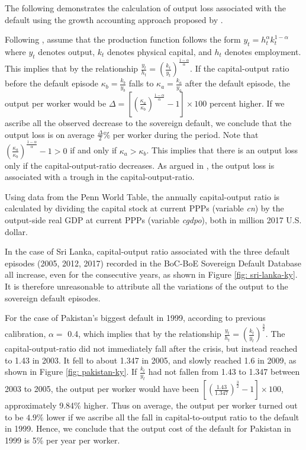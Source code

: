 The following demonstrates the calculation of output loss associated with the default using the growth accounting approach proposed by \citet{zarazaga-12}.

Following \citet{zarazaga-12}, assume that the production function follows the form $y_t = h^\alpha_t k^{1-\alpha}_t$ where $y_t$ denotes output, $k_t$ denotes physical capital, and $h_t$ denotes employment.
This implies that by the relationship $\frac{y_t}{h_t} = \left( \frac{k_t}{y_t} \right)^{\frac{1-\alpha}{\alpha}}$. If the capital-output ratio before the default episode $\kappa_b =\frac{k_b}{y_b}$ falls to $\kappa_a = \frac{k_{a}}{y_a}$ after the default episode, the output per worker would be
$\Delta = \left[\left(\frac{\kappa_a}{\kappa_b} \right)^{\frac{1-\alpha}{\alpha}} -1\right]\times 100$ percent higher.
If we ascribe all the observed decrease to the sovereign default, we conclude that the output loss is on average $\frac{\Delta}{2} \%$ per worker during the period.
Note that $\left(\frac{\kappa_a}{\kappa_b} \right)^{\frac{1-\alpha}{\alpha}} -1 > 0$ if and only if $\kappa_a > \kappa_b$. This implies that there is an output loss only if the capital-output-ratio decreases. As argued in \citet{zarazaga-12}, the output loss is associated with a trough in the capital-output-ratio.

Using data from the Penn World Table, the annually capital-output ratio is calculated by dividing the capital stock at current PPPs (variable \emph{cn}) by the output-side real GDP at current PPPs (variable \emph{cgdpo}), both in million 2017 U.S. dollar.

In the case of Sri Lanka, capital-output ratio associated with the three default episodes (2005, 2012, 2017) recorded in the BoC-BoE Sovereign Default Database all increase, even for the consecutive years, as shown in Figure \ref{fig: sri-lanka-ky}. It is therefore unreasonable to attribute all the variations of the output to the sovereign default episodes.

For the case of Pakistan's biggest default in 1999, according to previous calibration, $\alpha=$ 0.4, which implies that by the relationship $\frac{y_t}{h_t} = \left( \frac{k_t}{y_t} \right)^{\frac{3}{2}}$.
The capital-output-ratio did not immediately fall after the crisis, but instead reached to 1.43 in 2003. It fell to about 1.347 in 2005, and slowly reached 1.6 in 2009, as shown in Figure \ref{fig: pakistan-ky}.
If $\frac{k_t}{y_t}$ had not fallen from 1.43 to 1.347 between 2003 to 2005, the output per worker would have been $ \left[\left(\frac{1.43}{1.347} \right)^{\frac{3}{2}} -1\right]\times 100$, approximately 9.84\% higher. Thus on average, the output per worker turned out to be $4.9\%$ lower if we ascribe all the fall in capital-to-output ratio to the default in 1999. Hence, we conclude that the output cost of the default for Pakistan in 1999 is 5\% per year per worker.


